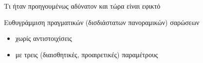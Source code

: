\begin{frame}{Τι ήταν προηγουμένως αδύνατον και τώρα είναι εφικτό}

  Ευθυγράμμιση πραγματικών (δισδιάστατων πανοραμικών) σαρώσεων
  \begin{itemize}
    \item χωρίς αντιστοιχίσεις
    \item με τρεις (διαισθητικές, προαιρετικές) παραμέτρους
  \end{itemize}





\end{frame}
